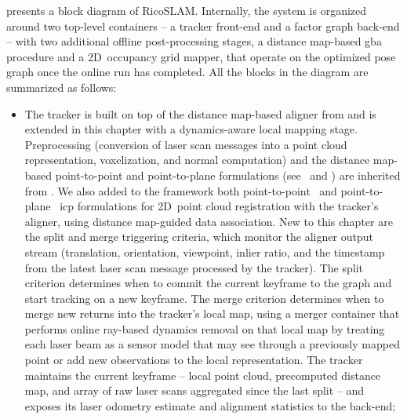  presents a block diagram of RicoSLAM.
Internally, the system is organized around two top-level containers -- a tracker
front-end and a factor graph back-end -- with two additional offline
post-processing stages, a distance map-based \gls{gba} procedure and a
2D~occupancy grid mapper, that operate on the optimized pose graph once the
online run has completed. All the blocks in the diagram are summarized as follows:
\begin{itemize}
\item The tracker is built on top of the distance map-based aligner from
       and is extended in this chapter with a
      dynamics-aware local mapping stage. Preprocessing
      (conversion of laser scan messages into a point cloud representation,
      voxelization, and normal computation) and the distance map-based
      point-to-point and point-to-plane formulations
      (see~ and
      ) are inherited from
      . We also added to the framework both
      point-to-point~\cite{besl-mckay:tpami:1992} and
      point-to-plane~\cite{chen-medioni:icra:1991} \gls{icp} formulations for
      2D~point cloud registration with the tracker's aligner,
      using distance map-guided data association.
      New to this chapter are the split and merge triggering criteria,
      which monitor the aligner output stream
      (translation, orientation, viewpoint, inlier ratio, and the
      timestamp from the latest laser scan message processed by the tracker).
      The split criterion determines when to commit the current keyframe to
      the graph and start tracking on a new keyframe.
      The merge criterion determines when to merge new returns into
      the tracker's local map, using a merger container that performs
      online ray-based dynamics removal on that local map by treating
      each laser beam as a sensor model that may see through a previously
      mapped point or add new observations to the local representation.
      The tracker maintains the current keyframe --
      local point cloud, precomputed distance map, and array of raw laser scans
      aggregated since the last split -- and exposes its
      laser odometry estimate and alignment statistics to the back-end;


\end{itemize}
